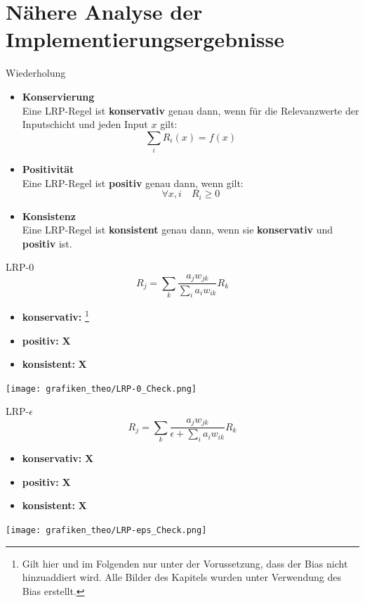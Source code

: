 \section{Nähere Analyse der Implementierungsergebnisse}
\frame{\sectionpage}
\begin{frame}{Wiederholung}
\begin{itemize}
\item \textbf{Konservierung} \\
Eine LRP-Regel ist \textbf{konservativ} genau dann, wenn für die Relevanzwerte der Inputschicht und jeden Input $x$ gilt:
\begin{equation*}
\sum_i R_i(x) = f(x)
\end{equation*}
\item \textbf{Positivität} \\
Eine LRP-Regel ist \textbf{positiv} genau dann, wenn gilt:
\begin{equation*}
\forall x, i \quad R_i \geq 0
\end{equation*}
\item \textbf{Konsistenz} \\
Eine LRP-Regel ist \textbf{konsistent} genau dann, wenn sie \textbf{konservativ} und \textbf{positiv} ist.
\end{itemize}
\end{frame}

\begin{frame}{LRP-0}
\begin{equation*}
R_{j}=\sum_{k} \frac{a_{j} w_{j k}}{\sum_{i} a_{i} w_{i k}} R_{k}
\end{equation*}
\begin{itemize}
\item \textbf{konservativ:} \checkmark\footnote{Gilt hier und im Folgenden nur unter der Vorussetzung, dass der Bias nicht hinzuaddiert wird. Alle Bilder des Kapitels wurden unter Verwendung des Bias erstellt.}
\item \textbf{positiv:} \hspace{0.71cm} \textbf{X}
\item \textbf{konsistent:} \hspace{0.1cm} \textbf{X}
\end{itemize}
\texttt{[image: grafiken\_theo/LRP-0\_Check.png]}
\end{frame}

\begin{frame}{LRP-$\epsilon$}
\begin{equation*}
R_{j}=\sum_{k} \frac{a_{j} w_{j k}}{\epsilon + \sum_{i} a_{i} w_{i k}} R_{k}
\end{equation*}
\begin{itemize}
\item \textbf{konservativ:} \textbf{X}
\item \textbf{positiv:} \hspace{0.71cm} \textbf{X}
\item \textbf{konsistent:} \hspace{0.1cm} \textbf{X}
\end{itemize}
\texttt{[image: grafiken\_theo/LRP-eps\_Check.png]}
\end{frame}

